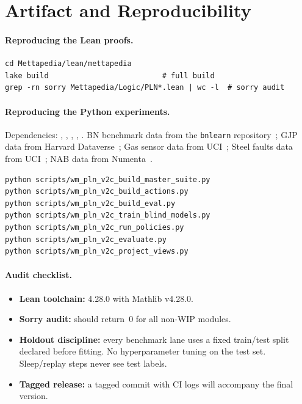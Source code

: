 \documentclass[11pt,openany]{report}
\begin{document}
\section{Artifact and Reproducibility}
\label{sec:artifact}

\paragraph{Reproducing the Lean proofs.}

\begin{lstlisting}
cd Mettapedia/lean/mettapedia
lake build                          # full build
grep -rn sorry Mettapedia/Logic/PLN*.lean | wc -l  # sorry audit
\end{lstlisting}

\paragraph{Reproducing the Python experiments.}

Dependencies: , , ,
, .  BN benchmark data from the
\texttt{bnlearn} repository~\cite{ScutariBnRepository};
GJP data from Harvard Dataverse~\cite{IARPA2024GJPData};
Gas sensor data from UCI~\cite{Vergara2012GasSensorDrift};
Steel faults data from UCI~\cite{Buscema2010SteelPlates};
NAB data from Numenta~\cite{Lavin2015NAB}.

\begin{lstlisting}
python scripts/wm_pln_v2c_build_master_suite.py
python scripts/wm_pln_v2c_build_actions.py
python scripts/wm_pln_v2c_build_eval.py
python scripts/wm_pln_v2c_train_blind_models.py
python scripts/wm_pln_v2c_run_policies.py
python scripts/wm_pln_v2c_evaluate.py
python scripts/wm_pln_v2c_project_views.py
\end{lstlisting}

\paragraph{Audit checklist.}
\begin{itemize}
\item \textbf{Lean toolchain:} 4.28.0 with Mathlib v4.28.0.
\item \textbf{Sorry audit:} 
  should return~0 for all non-WIP modules.
\item \textbf{Holdout discipline:} every benchmark lane uses a fixed train/test split
  declared before fitting.  No hyperparameter tuning on the test set.
  Sleep/replay steps never see test labels.
\item \textbf{Tagged release:} a tagged commit with CI logs will accompany the
  final version.
\end{itemize}
\end{document}
